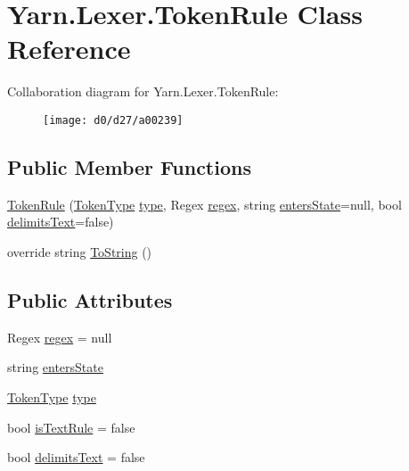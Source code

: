 \hypertarget{a00082}{\section{Yarn.\-Lexer.\-Token\-Rule Class Reference}
\label{a00082}
}


Collaboration diagram for Yarn.\-Lexer.\-Token\-Rule\-:
\nopagebreak
\begin{figure}[H]
\begin{center}
\leavevmode
\texttt{[image: d0/d27/a00239]}
\end{center}
\end{figure}
\subsection*{Public Member Functions}
\begin{DoxyCompactItemize}
\item 
\hyperlink{a00082_a3d171ae7c4870659d2d1d977a216bdd7}{Token\-Rule} (\hyperlink{a00026_a301aa7c866593a5b625a8fc158bbeace}{Token\-Type} \hyperlink{a00082_a0de6fac3b55cf0c61e07cea53ce67caa}{type}, Regex \hyperlink{a00082_a47a404d6637fae489c3c77729a01cc69}{regex}, string \hyperlink{a00082_af6a4bd3416c4e1b8e56f9db461d52d18}{enters\-State}=null, bool \hyperlink{a00082_ab0849136a1f27b4d13cb7a45e2fe7130}{delimits\-Text}=false)
\item 
override string \hyperlink{a00082_a1ed23ad16b116ecb06dd75b157bf752f}{To\-String} ()
\end{DoxyCompactItemize}
\subsection*{Public Attributes}
\begin{DoxyCompactItemize}
\item 
Regex \hyperlink{a00082_a47a404d6637fae489c3c77729a01cc69}{regex} = null
\item 
string \hyperlink{a00082_af6a4bd3416c4e1b8e56f9db461d52d18}{enters\-State}
\item 
\hyperlink{a00026_a301aa7c866593a5b625a8fc158bbeace}{Token\-Type} \hyperlink{a00082_a0de6fac3b55cf0c61e07cea53ce67caa}{type}
\item 
bool \hyperlink{a00082_a09f49e6edf9ace38a92d723998181f8f}{is\-Text\-Rule} = false
\item 
bool \hyperlink{a00082_ab0849136a1f27b4d13cb7a45e2fe7130}{delimits\-Text} = false
\end{DoxyCompactItemize}


